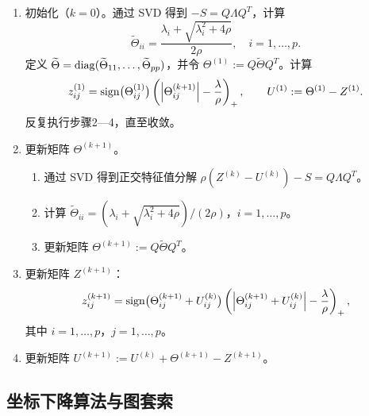 \begin{enumerate}[label=步骤\arabic*：,leftmargin=4.8em]
\item 初始化（$k=0$）。通过 SVD 得到 $-S=Q\Lambda Q^T$，计算
\[
\widetilde\Theta_{ii}=\frac{\lambda_i+\sqrt{\lambda_i^2+4\rho}}{2\rho},
\quad i=1,\ldots,p.
\]
定义 $\widetilde\Theta=\operatorname{diag}(\widetilde\Theta_{11},\ldots,\widetilde\Theta_{pp})$，并令 $\Theta^{(1)}:=Q\widetilde\Theta Q^T$。计算
\[
z_{ij}^{(1)}=\operatorname{sign}\bigl(\Theta_{ij}^{(1)}\bigr)
\left(\left|\Theta_{ij}^{(k+1)}\right|-\frac\lambda\rho\right)_+,
\qquad U^{(1)}:=\Theta^{(1)}-Z^{(1)}.
\]
反复执行步骤2—4，直至收敛。
\item 更新矩阵 $\Theta^{(k+1)}$。
\begin{enumerate}[label=\roman*.]
\item 通过 SVD 得到正交特征值分解 $\rho(Z^{(k)}-U^{(k)})-S=Q\Lambda Q^T$。
\item 计算 $\widetilde\Theta_{ii}=(\lambda_i+\sqrt{\lambda_i^2+4\rho})/(2\rho)$，$i=1,\ldots,p$。
\item 更新矩阵 $\Theta^{(k+1)}:=Q\widetilde\Theta Q^T$。
\end{enumerate}
\item 更新矩阵 $Z^{(k+1)}$：
\[
z_{ij}^{(k+1)}=\operatorname{sign}\bigl(\Theta_{ij}^{(k+1)}+U_{ij}^{(k)}\bigr)
\left(\left|\Theta_{ij}^{(k+1)}+U_{ij}^{(k)}\right|-\frac\lambda\rho\right)_+,
\]
其中 $i=1,\ldots,p$，$j=1,\ldots,p$。
\item 更新矩阵 $U^{(k+1)}:=U^{(k)}+\Theta^{(k+1)}-Z^{(k+1)}$。
\end{enumerate}

\subsection{坐标下降算法与图套索}

